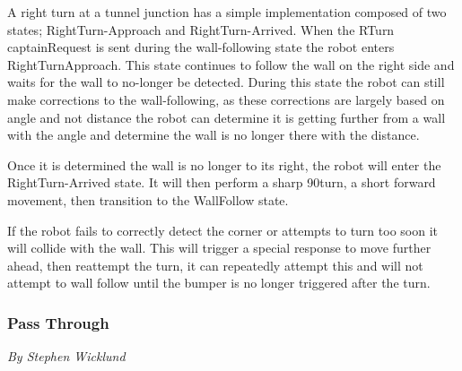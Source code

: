 \documentclass[12pt]{report}
\newcommand{\sectionAuthor}[1]{{\small\vspace{-1em}\textit{#1}}\bigskip\par}
\begin{document}
A right turn at a tunnel junction has a simple implementation composed of two states; RightTurn-Approach and RightTurn-Arrived. When the RTurn captainRequest is sent during the wall-following state the robot enters RightTurnApproach. This state continues to follow the wall on the right side and waits for the wall to no-longer be detected. During this state the robot can still make corrections to the wall-following, as these corrections are largely based on angle and not distance the robot can determine it is getting further from a wall with the angle and determine the wall is no longer there with the distance.

Once it is determined the wall is no longer to its right, the robot will enter the RightTurn-Arrived state. It will then perform a sharp 90\textdegree turn, a short forward movement, then transition to the WallFollow state.

If the robot fails to correctly detect the corner or attempts to turn too soon it will collide with the wall. This will trigger a special response to move further ahead, then reattempt the turn, it can repeatedly attempt this and will not attempt to wall follow until the bumper is no longer triggered after the turn.

\subsubsection{Pass Through}
\sectionAuthor{By Stephen Wicklund}
\end{document}

